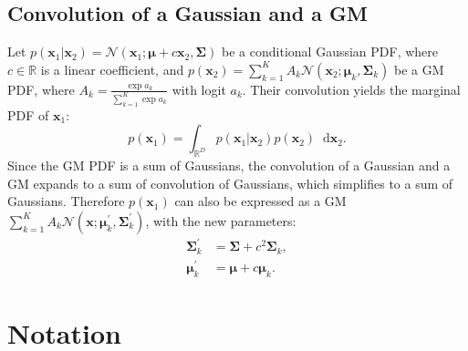 \documentclass{article}
\def\vmu{{\bm{\mu}}}
\def\vx{{\bm{x}}}
\def\mSigma{{\bm{\Sigma}}}
\newcommand{\R}{\mathbb{R}}
\theoremstyle{custom}
\theoremstyle{definition}
\theoremstyle{remark}
\newcommand{\diff}{\mathop{}\!\mathrm{d}}
\begin{document}
\subsection{Convolution of a Gaussian and a GM}
\label{sec:convolution}

Let $p(\vx_1 | \vx_2) = \mathcal{N}(\vx_1; \vmu + c \vx_2, \mSigma)$ be a conditional Gaussian PDF, where $c \in \R$ is a linear coefficient, and $p(\vx_2) = \sum_{k=1}^{K} A_k \mathcal{N}(\vx_2; \vmu_k, \mSigma_k)$ be a GM PDF, where $A_k = \frac{\exp a_k}{\sum_{k=1}^K \exp a_k}$ with logit $a_k$. Their convolution yields the marginal PDF of $\vx_1$:
\begin{equation}
    p(\vx_1) = \int_{\R^D} p(\vx_1 | \vx_2) p(\vx_2) \diff \vx_2.
\end{equation}
Since the GM PDF is a sum of Gaussians, the convolution of a Gaussian and a GM expands to a sum of convolution of Gaussians, which simplifies to a sum of Gaussians. Therefore $p(\vx_1)$ can also be expressed as a GM $\sum_{k=1}^{K} A_k \mathcal{N}(\vx; \vmu^\prime_k, \mSigma^\prime_k)$, with the new parameters:
\begin{align}
    \mSigma^\prime_k &= \mSigma + c^2\mSigma_k, \\
    \vmu^\prime_k &= \vmu + c \vmu_k.
\end{align}

\clearpage
\onecolumn
\section{Notation}
\end{document}
